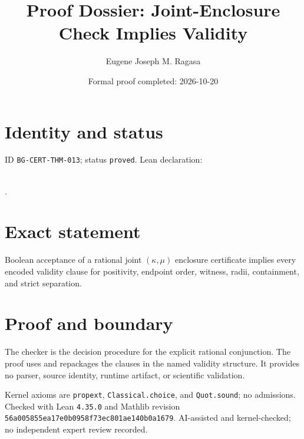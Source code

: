 \documentclass[11pt]{article}
\title{Proof Dossier: Joint-Enclosure Check Implies Validity}\author{Eugene Joseph M. Ragasa}\date{Formal proof completed: 2026-10-20}
\begin{document}
\maketitle
\section{Identity and status}
ID \texttt{BG-CERT-THM-013}; status \texttt{proved}. Lean declaration:
\par{}\\
{\tiny{}}.
\section{Exact statement}
Boolean acceptance of a rational joint $(\kappa,\mu)$ enclosure certificate implies every
encoded validity clause for positivity, endpoint order, witness, radii, containment, and
strict separation.
\section{Proof and boundary}
The checker is the decision procedure for the explicit rational conjunction. The proof
uses  and repackages the clauses in the named validity
structure. It provides no parser, source identity, runtime artifact, or scientific
validation.

Kernel axioms are \texttt{propext}, \texttt{Classical.choice}, and
\texttt{Quot.sound}; no admissions. Checked with Lean \texttt{4.35.0} and Mathlib
revision \texttt{56a005855ea17e0b0958f73ec801ae140b0a1679}. AI-assisted and
kernel-checked; no independent expert review recorded.
\end{document}
